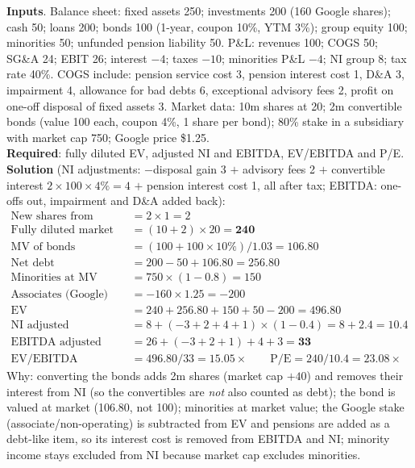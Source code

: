 \begin{exbox}
\textbf{Inputs}. Balance sheet: fixed assets 250; investments 200 (160 Google shares); cash 50; loans 200; bonds 100 (1-year, coupon 10\%, YTM 3\%); group equity 100; minorities 50; unfunded pension liability 50. P\&L: revenues 100; COGS 50; SG\&A 24; EBIT 26; interest $-4$; taxes $-10$; minorities P\&L $-4$; NI group 8; tax rate 40\%. COGS include: pension service cost 3, pension interest cost 1, D\&A 3, impairment 4, allowance for bad debts 6, exceptional advisory fees 2, profit on one-off disposal of fixed assets 3. Market data: 10m shares at 20; 2m convertible bonds (value 100 each, coupon 4\%, 1 share per bond); 80\% stake in a subsidiary with market cap 750; Google price \$1.25.\\
\textbf{Required}: fully diluted EV, adjusted NI and EBITDA, EV/EBITDA and P/E.\\
\textbf{Solution} (NI adjustments: $-$disposal gain 3 $+$ advisory fees 2 $+$ convertible interest $2\times100\times4\%=4$ $+$ pension interest cost 1, all after tax; EBITDA: one-offs out, impairment and D\&A added back):
\begin{align*}
\text{New shares from conversion}&=2\times1=2\\
\text{Fully diluted market cap}&=(10+2)\times20=\mathbf{240}\\
\text{MV of bonds}&=(100+100\times10\%)/1.03=106.80\\
\text{Net debt}&=200-50+106.80=256.80\\
\text{Minorities at MV}&=750\times(1-0.8)=150\\
\text{Associates (Google)}&=-160\times1.25=-200\\
\text{EV}&=240+256.80+150+50-200=\mathbf{496.80}\\
\text{NI adjusted}&=8+(-3+2+4+1)\times(1-0.4)=8+2.4=\mathbf{10.4}\\
\text{EBITDA adjusted}&=26+(-3+2+1)+4+3=\mathbf{33}\\
\text{EV/EBITDA}&=496.80/33=\mathbf{15.05\times}\qquad \text{P/E}=240/10.4=\mathbf{23.08\times}
\end{align*}
\footnotesize Why: converting the bonds adds 2m shares (market cap $+40$) and removes their interest from NI (so the convertibles are \emph{not} also counted as debt); the bond is valued at market (106.80, not 100); minorities at market value; the Google stake (associate/non-operating) is subtracted from EV and pensions are added as a debt-like item, so its interest cost is removed from EBITDA and NI; minority income stays excluded from NI because market cap excludes minorities.
\end{exbox}

